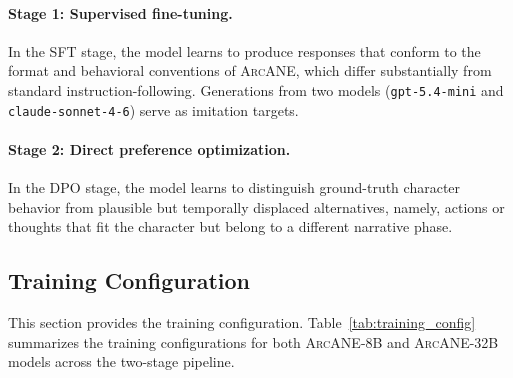 \documentclass[11pt]{article}
\newcommand{\ours}{\textsc{ArcANE}}
\begin{document}
\paragraph{Stage 1: Supervised fine-tuning.} In the SFT stage, the model learns to produce responses that conform to the format and behavioral conventions of \ours{}, which differ substantially from standard instruction-following. Generations from two models (\texttt{gpt-5.4-mini} and \texttt{claude-sonnet-4-6}) serve as imitation targets.
 
\paragraph{Stage 2: Direct preference optimization.} In the DPO stage, the model learns to distinguish ground-truth character behavior from plausible but temporally displaced alternatives, namely, actions or thoughts that fit the character but belong to a different narrative phase.


\subsection{Training Configuration}
\label{app:training_model}
This section provides the training configuration. Table~\ref{tab:training_config} summarizes the training configurations for both \ours{}-8B and \ours{}-32B models across the two-stage pipeline.
\end{document}
